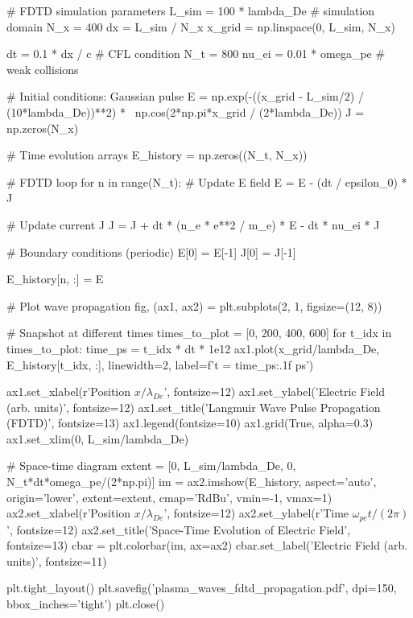 \documentclass[11pt,a4paper]{article}
\begin{document}
\begin{pycode}
# FDTD simulation parameters
L_sim = 100 * lambda_De  # simulation domain
N_x = 400
dx = L_sim / N_x
x_grid = np.linspace(0, L_sim, N_x)

dt = 0.1 * dx / c  # CFL condition
N_t = 800
nu_ei = 0.01 * omega_pe  # weak collisions

# Initial conditions: Gaussian pulse
E = np.exp(-((x_grid - L_sim/2) / (10*lambda_De))**2) * \
    np.cos(2*np.pi*x_grid / (2*lambda_De))
J = np.zeros(N_x)

# Time evolution arrays
E_history = np.zeros((N_t, N_x))

# FDTD loop
for n in range(N_t):
    # Update E field
    E = E - (dt / epsilon_0) * J

    # Update current J
    J = J + dt * (n_e * e**2 / m_e) * E - dt * nu_ei * J

    # Boundary conditions (periodic)
    E[0] = E[-1]
    J[0] = J[-1]

    E_history[n, :] = E

# Plot wave propagation
fig, (ax1, ax2) = plt.subplots(2, 1, figsize=(12, 8))

# Snapshot at different times
times_to_plot = [0, 200, 400, 600]
for t_idx in times_to_plot:
    time_ps = t_idx * dt * 1e12
    ax1.plot(x_grid/lambda_De, E_history[t_idx, :],
             linewidth=2, label=f't = {time_ps:.1f} ps')

ax1.set_xlabel(r'Position $x/\lambda_{De}$', fontsize=12)
ax1.set_ylabel('Electric Field (arb. units)', fontsize=12)
ax1.set_title('Langmuir Wave Pulse Propagation (FDTD)', fontsize=13)
ax1.legend(fontsize=10)
ax1.grid(True, alpha=0.3)
ax1.set_xlim(0, L_sim/lambda_De)

# Space-time diagram
extent = [0, L_sim/lambda_De, 0, N_t*dt*omega_pe/(2*np.pi)]
im = ax2.imshow(E_history, aspect='auto', origin='lower',
                extent=extent, cmap='RdBu', vmin=-1, vmax=1)
ax2.set_xlabel(r'Position $x/\lambda_{De}$', fontsize=12)
ax2.set_ylabel(r'Time $\omega_{pe}t/(2\pi)$', fontsize=12)
ax2.set_title('Space-Time Evolution of Electric Field', fontsize=13)
cbar = plt.colorbar(im, ax=ax2)
cbar.set_label('Electric Field (arb. units)', fontsize=11)

plt.tight_layout()
plt.savefig('plasma_waves_fdtd_propagation.pdf', dpi=150, bbox_inches='tight')
plt.close()
\end{pycode}
\end{document}

